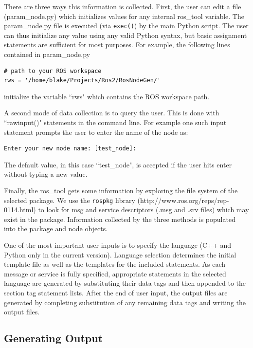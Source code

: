 \documentclass[letterpaper, 10 pt, conference]{ieeeconf}  %
\begin{document}
There are three ways this information is collected.   First, the user can edit a file (param\_node.py) which initializes values for any internal ros\_tool variable.  The  param\_node.py file is executed (via {\tt exec()}) by the main Python script.  The user can thus initialize any value using any valid Python syntax, but basic assignment statements are sufficient for most purposes.  For example, the following lines contained in param\_node.py

\begin{verbatim}
# path to your ROS workspace
rws = '/home/blake/Projects/Ros2/RosNodeGen/'
\end{verbatim}

initialize the variable ``rws" which contains the ROS workspace path.

A second mode of data collection is to query the user.   This is done with ``rawinput()" statements in the command line.  For example one such input statement prompts the user to enter the name of the node as:

\begin{verbatim}
Enter your new node name: [test_node]:
\end{verbatim}

The default value, in this case ``test\_node", is accepted if the user hits enter without typing a new value.

Finally, the ros\_tool gets some information by exploring the file system of the selected package.  We use the {\tt rospkg} library (http://www.ros.org/reps/rep-0114.html) to look for msg and service descriptors (.msg and .srv files) which may exist in the package.   Information collected by the three methods is populated into the package and node objects.

One of the most important user inputs is to specify the language (C++ and Python only in the current version).   Language selection determines the initial template file as well as the templates for the included statements.  As each message or service is fully specified, appropriate statements in the selected language are generated by substituting their data tags and then appended to the section tag statement lists.    After the end of user input, the output files are generated by completing substitution of any remaining data tags and writing the output files.

\subsection{Generating Output}
\end{document}
